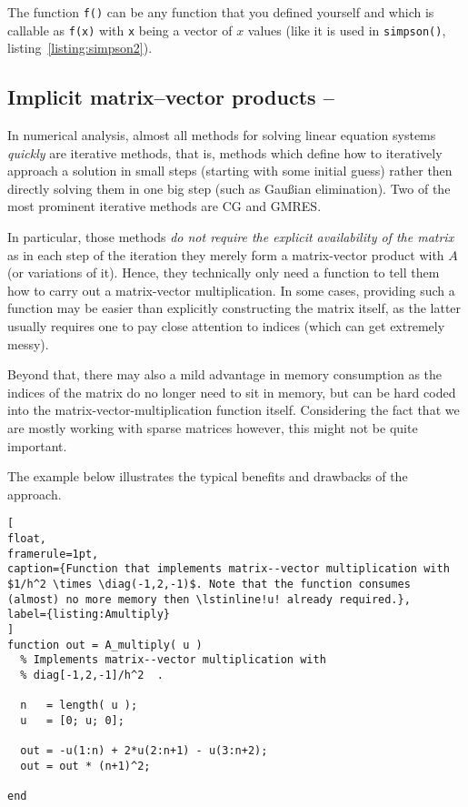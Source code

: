 The function \lstinline!f()! can be any function that you defined yourself and
which is callable as \lstinline!f(x)! with \lstinline!x! being a vector of $x$
values (like it is used in \lstinline!simpson()!, listing~\ref{listing:simpson2}).



\subsection{Implicit matrix--vector products -- \cleansymbol}

In numerical analysis, almost all methods for solving linear equation systems
\emph{quickly} are iterative methods, that is, methods which define how to
iteratively approach a solution in small steps (starting with some initial
guess) rather then directly solving them in one big step (such as Gau{\ss}ian
elimination). Two of the most prominent iterative methods are CG and GMRES.

In particular, those methods \emph{do not require the explicit availability of
the matrix} as in each step of the iteration they merely form a matrix-vector
product with $A$ (or variations of it). Hence, they technically only need a
function to tell them how to carry out a matrix-vector multiplication. In some
cases, providing such a function may be easier than explicitly constructing
the matrix itself, as the latter usually requires one to pay close attention
to indices (which can get extremely messy).

Beyond that, there may also a mild advantage in memory consumption as the
indices of the matrix do no longer need to sit in memory, but can be hard coded
into the matrix-vector-multiplication function itself. Considering the fact
that we are mostly working with sparse matrices however, this might not be
quite important.

The example below illustrates the typical benefits and drawbacks of the
approach.

\begin{lstlisting}[
float,
framerule=1pt,
caption={Function that implements matrix--vector multiplication with $1/h^2 \times \diag(-1,2,-1)$. Note that the function consumes (almost) no more memory then \lstinline!u! already required.},
label={listing:Amultiply}
]
function out = A_multiply( u )
  % Implements matrix--vector multiplication with
  % diag[-1,2,-1]/h^2  .

  n   = length( u );
  u   = [0; u; 0];

  out = -u(1:n) + 2*u(2:n+1) - u(3:n+2);
  out = out * (n+1)^2;

end
\end{lstlisting}


